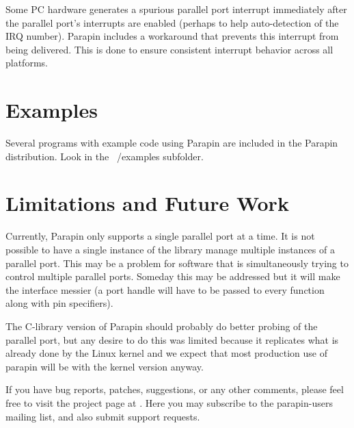 \documentclass{article}
\begin{document}
Some PC hardware generates a spurious parallel port interrupt
immediately after the parallel port's interrupts are enabled (perhaps
to help auto-detection of the IRQ number).  Parapin includes a
workaround that prevents this interrupt from being delivered.  This is
done to ensure consistent interrupt behavior across all platforms.


\section{Examples}

Several programs with example code using Parapin are included in
the Parapin distribution.  Look in the ~/examples subfolder.

\section{Limitations and Future Work}

Currently, Parapin only supports a single parallel port at a time.  It
is not possible to have a single instance of the library manage
multiple instances of a parallel port.  This may be a problem for
software that is simultaneously trying to control multiple parallel
ports.  Someday this may be addressed but it will make the interface
messier (a port handle will have to be passed to every function along
with pin specifiers).

The C-library version of Parapin should probably do better probing of
the parallel port, but any desire to do this was limited because it
replicates what is already done by the Linux kernel and we expect that
most production use of parapin will be with the kernel version anyway.

If you have bug reports, patches, suggestions, or any other comments,
please feel free to visit the project page at
.
Here you may subscribe to the parapin-users mailing list, and also
submit support requests.
\end{document}
